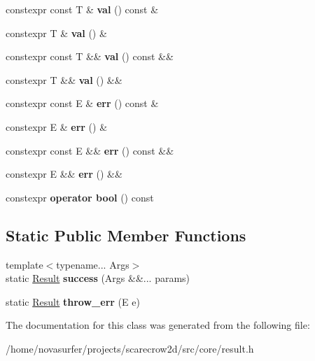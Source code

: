 \begin{DoxyCompactItemize}
\item 
\mbox{\label{classsc2d_1_1Result_adbec291066fcd4d76fb91b3930a0557e}} 
constexpr const T \& {\bfseries val} () const \&
\item 
\mbox{\label{classsc2d_1_1Result_ad98b0e5377de8f6a9b19e808aa7b38a4}} 
constexpr T \& {\bfseries val} () \&
\item 
\mbox{\label{classsc2d_1_1Result_ac53ded8037e3f259782b10f61a4b6291}} 
constexpr const T \&\& {\bfseries val} () const \&\&
\item 
\mbox{\label{classsc2d_1_1Result_ad13360c1bb6ef0001e7f3a2b149b42ff}} 
constexpr T \&\& {\bfseries val} () \&\&
\item 
\mbox{\label{classsc2d_1_1Result_a952b7cc36442049e7f86aa654c23647c}} 
constexpr const E \& {\bfseries err} () const \&
\item 
\mbox{\label{classsc2d_1_1Result_af49dc802cc45fe7a6451999f10efdf11}} 
constexpr E \& {\bfseries err} () \&
\item 
\mbox{\label{classsc2d_1_1Result_aab413ceab94861119442fff13a9664b7}} 
constexpr const E \&\& {\bfseries err} () const \&\&
\item 
\mbox{\label{classsc2d_1_1Result_aa8a0fd1987035dc93c6549bf600dc00b}} 
constexpr E \&\& {\bfseries err} () \&\&
\item 
\mbox{\label{classsc2d_1_1Result_affda3e94a952eff5c076c22c5570a200}} 
constexpr {\bfseries operator bool} () const
\end{DoxyCompactItemize}
\subsection*{Static Public Member Functions}
\begin{DoxyCompactItemize}
\item 
\mbox{\label{classsc2d_1_1Result_a93d2a76f5e090a49c197148555ae8d32}} 
{\footnotesize template$<$typename... Args$>$ }\\static \hyperlink{classsc2d_1_1Result}{Result} {\bfseries success} (Args \&\&... params)
\item 
\mbox{\label{classsc2d_1_1Result_ac8037070cbbe32cf483eebcf8d672634}} 
static \hyperlink{classsc2d_1_1Result}{Result} {\bfseries throw\+\_\+err} (E e)
\end{DoxyCompactItemize}


The documentation for this class was generated from the following file\+:\begin{DoxyCompactItemize}
\item 
/home/novasurfer/projects/scarecrow2d/src/core/result.\+h\end{DoxyCompactItemize}
